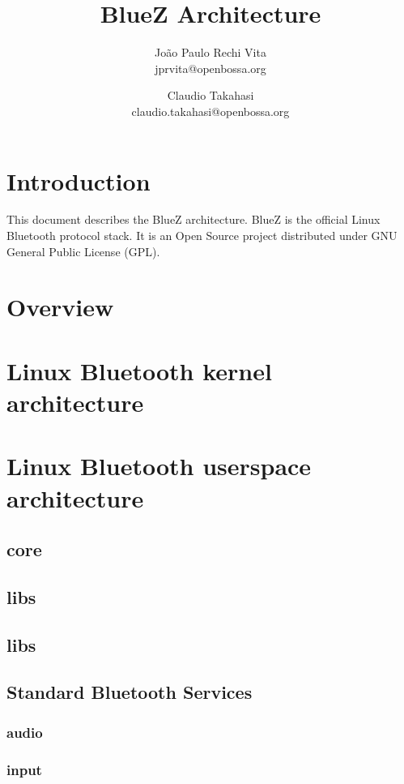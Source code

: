 \documentclass[11pt]{article}
\title{BlueZ Architecture}
\author{João Paulo Rechi Vita \\
			jprvita@openbossa.org
		\and
		Claudio Takahasi \\
		claudio.takahasi@openbossa.org}
\begin{document}
\maketitle
\newpage

\tableofcontents
\newpage

\section{Introduction}

This document describes the BlueZ architecture. BlueZ is the official Linux
Bluetooth protocol stack. It is an Open Source project distributed under GNU
General Public License (GPL).

\section{Overview}

\section{Linux Bluetooth kernel architecture}

\section{Linux Bluetooth userspace architecture}

\subsection{core}

\subsection{libs}

\subsection{libs}

\subsection{Standard Bluetooth Services}

\subsubsection{audio}
\subsubsection{input}
\end{document}
